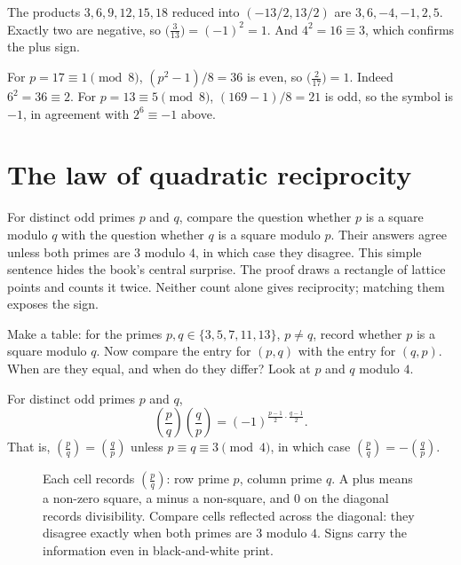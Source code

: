 \begin{examplex}[Gauss's count for $a=3$, $p=13$]
The products $3,6,9,12,15,18$ reduced into $(-13/2,13/2)$ are $3,6,-4,-1,2,5$.
Exactly two are negative, so $\bigl(\frac{3}{13}\bigr)=(-1)^2=1$.
And $4^2=16\equiv 3$, which confirms the plus sign.
\end{examplex}

\begin{examplex}[the supplementary law at $p=17$ and $p=13$]
For $p=17\equiv 1\pmod 8$, $(p^2-1)/8=36$ is even, so $\bigl(\frac{2}{17}\bigr)=1$. Indeed $6^2=36\equiv 2$.
For $p=13\equiv 5\pmod 8$, $(169-1)/8=21$ is odd, so the symbol is $-1$, in agreement with $2^6\equiv -1$ above.
\end{examplex}

\section{The law of quadratic reciprocity}

For distinct odd primes $p$ and $q$, compare the question whether $p$ is a square modulo $q$ with the question whether $q$ is a square modulo $p$. Their answers agree unless both primes are $3$ modulo $4$, in which case they disagree. This simple sentence hides the book's central surprise. The proof draws a rectangle of lattice points and counts it twice. Neither count alone gives reciprocity; matching them exposes the sign.

\begin{think}
Make a table: for the primes $p,q\in\{3,5,7,11,13\}$, $p\ne q$, record whether $p$ is a square modulo $q$. Now compare the entry for $(p,q)$ with the entry for $(q,p)$. When are they equal, and when do they differ? Look at $p$ and $q$ modulo $4$.
\end{think}

\begin{theorem}\label{thm:qr}
For distinct odd primes $p$ and $q$,
\[
\left(\frac pq\right)\left(\frac qp\right)=(-1)^{\frac{p-1}2\cdot\frac{q-1}2}.
\]
That is, $\left(\frac pq\right)=\left(\frac qp\right)$ unless $p\equiv q\equiv3\pmod4$, in which case $\left(\frac pq\right)=-\left(\frac qp\right)$.
\end{theorem}

\begin{figure}[ht]
\centering
{}
\caption{Each cell records $\left(\frac pq\right)$: row prime $p$, column
prime $q$. A plus means a non-zero square, a minus a non-square, and $0$
on the diagonal records divisibility. Compare cells reflected across the
diagonal: they disagree exactly when both primes are $3$ modulo $4$.
Signs carry the information even in black-and-white print.}
\label{fig:reciprocitytable}
\end{figure}

